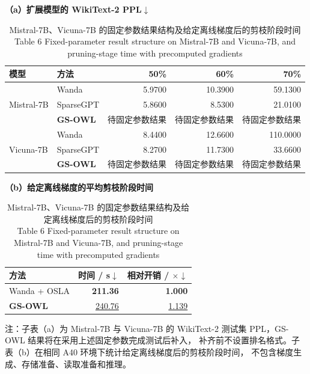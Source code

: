 \documentclass[UTF8,fontset=fandol]{ctexart}
\renewcommand{\arraystretch}{1.08}
\newcommand{\best}[1]{\textbf{#1}}
\newcommand{\second}[1]{\underline{#1}}
\begin{document}
\begin{table}[!htbp]
\centering
\caption{Mistral-7B、Vicuna-7B 的固定参数结果结构及给定离线梯度后的剪枝阶段时间\\
Table 6 Fixed-parameter result structure on Mistral-7B and Vicuna-7B, and pruning-stage time with precomputed gradients}
\label{tab:generalization}
\begin{minipage}{0.62\textwidth}
\centering
\scriptsize
\textbf{（a）扩展模型的 WikiText-2 PPL$\downarrow$}\par\vspace{2pt}
\setlength{\tabcolsep}{3.4pt}
\renewcommand{\arraystretch}{0.98}
\begin{tabular}{llrrr}
\toprule
模型 & 方法 & 50\% & 60\% & 70\% \\
\midrule
\multirow{3}{*}{Mistral-7B}
 & Wanda & 5.9700 & 10.3900 & 59.1300 \\
 & SparseGPT & 5.8600 & 8.5300 & 21.0100 \\
 & \textbf{GS-OWL} & 待固定参数结果 & 待固定参数结果 & 待固定参数结果 \\
\midrule
\multirow{3}{*}{Vicuna-7B}
 & Wanda & 8.4400 & 12.6600 & 110.0000 \\
 & SparseGPT & 8.2700 & 11.7300 & 33.6600 \\
 & \textbf{GS-OWL} & 待固定参数结果 & 待固定参数结果 & 待固定参数结果 \\
\bottomrule
\end{tabular}
\end{minipage}
\hfill
\begin{minipage}{0.34\textwidth}
\centering
\scriptsize
\textbf{（b）给定离线梯度的平均剪枝阶段时间}\par\vspace{2pt}
\setlength{\tabcolsep}{3.6pt}
\renewcommand{\arraystretch}{1.00}
\begin{tabular}{lrr}
\toprule
方法 & 时间 / s$\downarrow$ & 相对开销 / $\times$$\downarrow$ \\
\midrule
Wanda + OSLA & \best{211.36} & \best{1.000} \\
\textbf{GS-OWL} & \second{240.76} & \second{1.139} \\
\bottomrule
\end{tabular}
\end{minipage}
\vspace{2pt}
\parbox{0.96\textwidth}{\scriptsize
注：子表（a）为 Mistral-7B 与 Vicuna-7B 的 WikiText-2 测试集 PPL，GS-OWL 结果将在采用上述固定参数完成测试后补入，
补齐前不设置排名格式。子表（b）在相同 A40 环境下统计给定离线梯度后的剪枝阶段时间，
不包含梯度生成、存储准备、读取准备和推理。}
\end{table}
\end{document}
